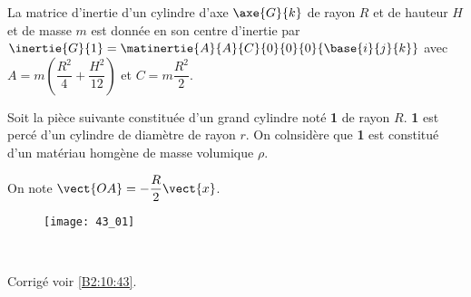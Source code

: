 \normaltrue \difficilefalse \tdifficilefalse
\correctionfalse


\setcounter{question}{0}
\ifcorrection
\else
{}
\fi




\ifprof
\else
La matrice d'inertie d'un cylindre d'axe $\axe{G}{k}$ de rayon $R$ et de hauteur $H$ et de masse $m$ est donnée en son centre d'inertie par 
$\inertie{G}{1}=\matinertie{A}{A}{C}{0}{0}{0}{\base{i}{j}{k}}$ avec $A=m\left(\dfrac{R^2}{4}+\dfrac{H^2}{12} \right)$ et $C=m\dfrac{R^2}{2}$. 

Soit la pièce suivante constituée d'un grand cylindre noté \textbf{1} de rayon $R$.  \textbf{1} est percé d'un cylindre de diamètre de rayon $r$. On colnsidère que \textbf{1} est constitué d'un matériau homgène de masse volumique $\rho$. 

On note $\vect{OA}=-\dfrac{R}{2}\vect{x}$. 
\begin{figure}[H]
\centering
\texttt{[image: 43\_01]}
\end{figure}
\fi


\ifprof
\else
\fi

\ifprof ~\\
\else
\fi


\ifprof
\else
\begin{flushright}
\footnotesize{Corrigé voir \ref{B2:10:43}.}
\end{flushright}%
\fi